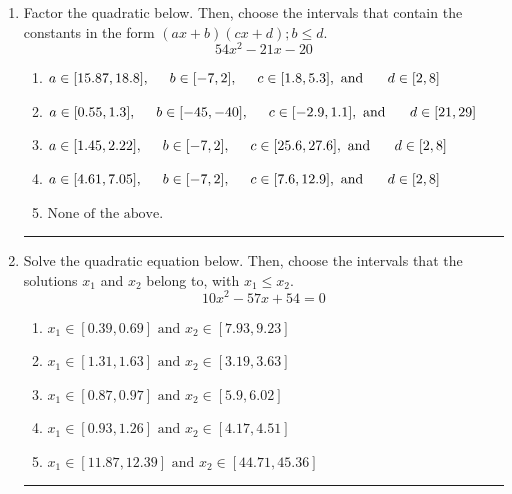 \documentclass[14pt]{extbook}
\newcommand{\litem}[1]{\item#1\hspace*{-1cm}\rule{\textwidth}{0.4pt}}
\begin{document}
\begin{enumerate}
{\begin{enumerate}[label=\Alph*.]
\end{enumerate} }
\litem{
Factor the quadratic below. Then, choose the intervals that contain the constants in the form $(ax+b)(cx+d); b \leq d.$\[ 54x^{2} -21 x -20 \]\begin{enumerate}[label=\Alph*.]
\item \( a \in [15.87, 18.8], \hspace*{5mm} b \in [-7, 2], \hspace*{5mm} c \in [1.8, 5.3], \text{ and } \hspace*{5mm} d \in [2, 8] \)
\item \( a \in [0.55, 1.3], \hspace*{5mm} b \in [-45, -40], \hspace*{5mm} c \in [-2.9, 1.1], \text{ and } \hspace*{5mm} d \in [21, 29] \)
\item \( a \in [1.45, 2.22], \hspace*{5mm} b \in [-7, 2], \hspace*{5mm} c \in [25.6, 27.6], \text{ and } \hspace*{5mm} d \in [2, 8] \)
\item \( a \in [4.61, 7.05], \hspace*{5mm} b \in [-7, 2], \hspace*{5mm} c \in [7.6, 12.9], \text{ and } \hspace*{5mm} d \in [2, 8] \)
\item \( \text{None of the above.} \)

\end{enumerate} }
\litem{
Solve the quadratic equation below. Then, choose the intervals that the solutions $x_1$ and $x_2$ belong to, with $x_1 \leq x_2$.\[ 10x^{2} -57 x + 54 = 0 \]\begin{enumerate}[label=\Alph*.]
\item \( x_1 \in [0.39, 0.69] \text{ and } x_2 \in [7.93, 9.23] \)
\item \( x_1 \in [1.31, 1.63] \text{ and } x_2 \in [3.19, 3.63] \)
\item \( x_1 \in [0.87, 0.97] \text{ and } x_2 \in [5.9, 6.02] \)
\item \( x_1 \in [0.93, 1.26] \text{ and } x_2 \in [4.17, 4.51] \)
\item \( x_1 \in [11.87, 12.39] \text{ and } x_2 \in [44.71, 45.36] \)


\end{enumerate}}
\end{enumerate}
\end{document}
